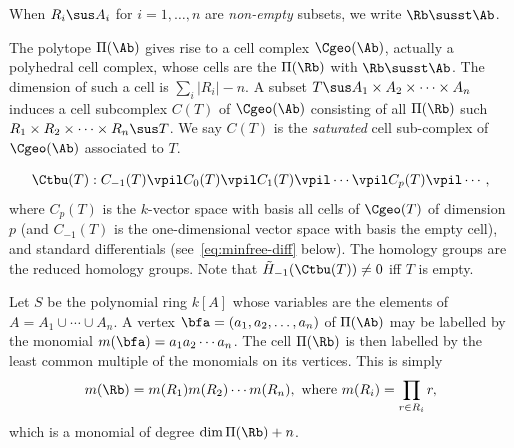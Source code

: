 \begin{nota}
  When  $R_i \sus A_i$ for $ i = 1, \ldots, n$ are {\it non-empty} subsets,
  we write $\Rb \susst \Ab$.
\end{nota}


\begin{defi}
  The polytope $\Pi(\Ab)$ gives rise to a cell complex $\Cgeo(\Ab)$,
  actually a polyhedral cell complex,
whose cells are the $\Pi(\Rb)$ with $\Rb \susst \Ab$. 
The dimension of such a cell is $\sum_i |R_i| - n$.
A subset $T \sus A_1 \times A_2 \times \cdots \times A_n$
induces a cell subcomplex $C(T)$ of $\Cgeo(\Ab)$ consisting of all
$\Pi(\Rb)$ such
$R_1 \times R_2 \times \cdots \times R_n \sus T$.
We say $C(T)$ is the {\it saturated} cell sub-complex of
$\Cgeo(\Ab)$ associated to $T$. 
\end{defi}

\medskip
{}
\begin{equation} \label{eq:minfree-Ct}
  \Ctbu(T): C_{-1}(T) \vpil C_0(T) \vpil C_1(T) \vpil
  \cdots \vpil C_p(T) \vpil \cdots ,
\end{equation}
where $C_p(T)$ is the $k$-vector space with basis all cells
of $\Cgeo(T)$ of dimension $p$ (and $C_{-1}(T)$ is the one-dimensional
vector space with basis the empty cell), and standard differentials
(see~\eqref{eq:minfree-diff} below). The homology groups are the
reduced homology groups. Note that $\tilde{H}_{-1}(\Ctbu(T)) \neq 0$ iff
$T$ is empty. 

Let $S$ be the polynomial ring $k[A]$ whose variables
are the elements of $A = A_1 \cup \cdots \cup A_n$. 
A vertex $\bfa = (a_1,a_2, \ldots, a_n)$ of $\Pi(\Ab)$
may be labelled by the monomial
$m(\bfa) = a_1a_2\cdots a_n$. The cell $\Pi(\Rb)$ is then labelled by
the least common multiple of the monomials on its vertices. This is
simply
\[ m(\Rb) = m(R_1)m(R_2) \cdots m(R_n), \text{ where }
  m(R_i) = \prod_{r \in R_i}r,\]
which is a monomial of degree $\dim \Pi(\Rb) + n$. 

